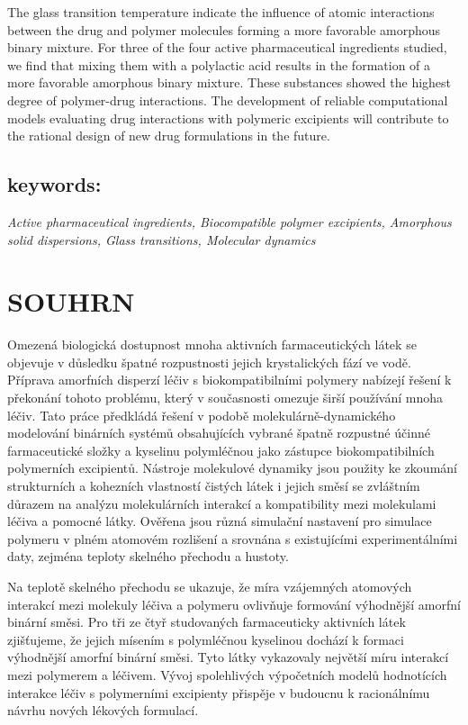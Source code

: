 The glass transition temperature indicate the influence of atomic interactions between the drug and polymer molecules forming a more favorable amorphous binary mixture. For three of the four active pharmaceutical ingredients studied, we find that mixing them with a polylactic acid results in the formation of a more favorable amorphous binary mixture. These substances showed the highest degree of polymer-drug interactions. The development of reliable computational models evaluating drug interactions with polymeric excipients will contribute to the rational design of new drug formulations in the future.


\subsection*{keywords:}
\textit{Active pharmaceutical ingredients, Biocompatible polymer excipients, Amorphous solid dispersions, Glass transitions, Molecular dynamics}

\newpage
\thispagestyle{empty}
\section*{SOUHRN}
Omezená biologická dostupnost mnoha aktivních farmaceutických látek se objevuje v důsledku špatné rozpustnosti jejich krystalických fází ve vodě. Příprava amorfních disperzí léčiv s biokompatibilními polymery nabízejí řešení k překonání tohoto problému, který v současnosti omezuje širší používání mnoha léčiv. Tato práce předkládá řešení v podobě molekulárně-dynamického modelování binárních systémů obsahujících vybrané špatně rozpustné účinné farmaceutické složky a kyselinu polymléčnou jako zástupce biokompatibilních polymerních excipientů. Nástroje molekulové dynamiky jsou použity ke zkoumání strukturních a kohezních vlastností čistých látek i jejich směsí se zvláštním důrazem na analýzu molekulárních interakcí a kompatibility mezi molekulami léčiva a pomocné látky. Ověřena jsou různá simulační nastavení pro simulace polymeru v plném atomovém rozlišení a srovnána s existujícími experimentálními daty, zejména teploty skelného přechodu a hustoty.

Na teplotě skelného přechodu se ukazuje, že míra vzájemných atomových interakcí mezi molekuly léčiva a polymeru ovlivňuje formování výhodnější amorfní binární směsi. Pro tři ze čtyř studovaných farmaceuticky aktivních látek zjišťujeme, že jejich mísením s polymléčnou kyselinou dochází k formaci výhodnější amorfní binární směsi. Tyto látky vykazovaly největší míru interakcí mezi polymerem a léčivem. Vývoj spolehlivých výpočetních modelů hodnotících interakce léčiv s polymerními excipienty přispěje v budoucnu k racionálnímu návrhu nových lékových formulací.


